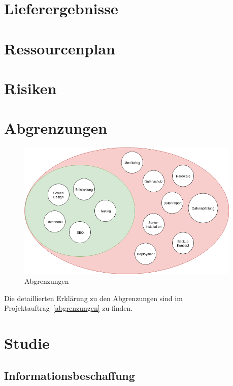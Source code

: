 \section{Lieferergebnisse}

\section{Ressourcenplan}

\section{Risiken}

\clearpage

\section{Abgrenzungen}

\begin{figure}[!htb]
  \centering
  \includegraphics[width=0.95\textwidth]{figures/abgrenzungen.png}
  \caption{Abgrenzungen}
\end{figure}

Die detaillierten Erklärung zu den Abgrenzungen sind im Projektauftrag~\ref{abgrenzungen} zu finden.

\clearpage

\section{Studie}

\subsection{Informationsbeschaffung}

